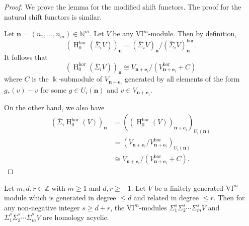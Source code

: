 \documentclass{amsart}
\numberwithin{equation}{section}
\DeclareMathOperator{\HH}{H}
\newcommand{\N}{{\mathbb{N}}}
\newcommand{\hor}{{\mathrm{hor}}}
\newcommand{\VI}{{\mathrm{VI}}}
\newcommand{\SSigma}{{\overline{\Sigma}}}
\begin{document}
\begin{proof}
   We prove the lemma for the modified shift functors. The proof for the natural shift functors is similar.

   Let $\mathbf{n}=(n_1, \ldots, n_m)\in \N^m$. Let $V$ be any $\VI^m$-module. Then by definition,
   \[ (\HH_0^\hor (\SSigma_i V))_{\mathbf{n}} = (\SSigma_i V)_{\mathbf{n}}/ (\SSigma_i V)^\hor_{\mathbf{n}} . \]
   It follows that 
   \[ (\HH_0^\hor (\SSigma_i V))_{\mathbf{n}} \cong V_{\mathbf{n}+\mathbf{e}_i}/( V^\hor_{\mathbf{n}+\mathbf{e}_i}+C) \]
   where $C$ is the $\Bbbk$-submodule of $V_{\mathbf{n}+\mathbf{e}_i}$ generated by all elements of the form $g_*(v)-v$ for some $g\in U_i(\mathbf{n})$ and $v\in V_{\mathbf{n}+\mathbf{e}_i}$.
   
   On the other hand, we also have
   \begin{align*}
      (\SSigma_i \HH_0^\hor(V))_{\mathbf{n}} 
      &= ((\HH_0^\hor(V))_{\mathbf{n}+\mathbf{e}_i})_{U_i(\mathbf{n})}  \\
      &= ( V_{\mathbf{n}+\mathbf{e}_i} / V^\hor_{\mathbf{n}+\mathbf{e}_i} )_{U_i(\mathbf{n})}  \\
      &\cong V_{\mathbf{n}+\mathbf{e}_i}/( V^\hor_{\mathbf{n}+\mathbf{e}_i} + C).
   \end{align*}   
\end{proof}

\begin{theorem} \label{thm: shift}
      Let $m,d,r\in\mathbb{Z}$ with $m\geqslant 1$ and $d, r\geqslant -1$. Let $V$ be a finitely generated $\VI^m$-module which is generated in degree $\leqslant d$ and related in degree $\leqslant r$. Then for any non-negative integer $s\geqslant d+r$, the $\VI^m$-modules $\Sigma_1^s \Sigma_2^s \cdots \Sigma_m^s V$ and $\SSigma_1^s \SSigma_2^s \cdots \SSigma_m^s V$ are homology acyclic. 
\end{theorem}
\end{document}
